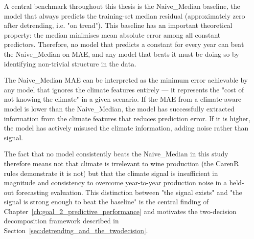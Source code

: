 A central benchmark throughout this thesis is the Naive\_Median baseline, the model that always predicts the training-set median residual (approximately zero after detrending, i.e. "on trend"). This baseline has an important theoretical property: the median minimises mean absolute error among all constant predictors. Therefore, no model that predicts a constant for every year can beat the Naive\_Median on MAE, and any model that beats it must be doing so by identifying non-trivial structure in the data.

The Naive\_Median MAE can be interpreted as the minimum error achievable by any model that ignores the climate features entirely --- it represents the "cost of not knowing the climate" in a given scenario. If the MAE from a climate-aware model is lower than the Naive\_Median, the model has successfully extracted information from the climate features that reduces prediction error. If it is higher, the model has actively misused the climate information, adding noise rather than signal.

The fact that no model consistently beats the Naive\_Median in this study therefore means not that climate is irrelevant to wine production (the CarenR rules demonstrate it is not) but that the climate signal is insufficient in magnitude and consistency to overcome year-to-year production noise in a held-out forecasting evaluation. This distinction between "the signal exists" and "the signal is strong enough to beat the baseline" is the central finding of Chapter~\ref{ch:goal_2_predictive_performance} and motivates the two-decision decomposition framework described in Section~\ref{sec:detrending_and_the_twodecision}.
